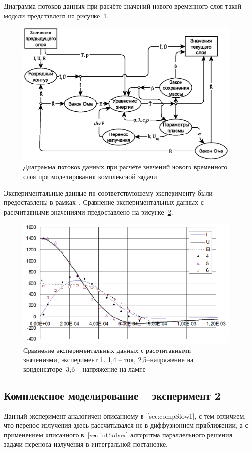 Диаграмма потоков данных при расчёте значений нового временного слоя такой 
модели представлена на рисунке~\ref{fig:dfdComplex}.

\begin{figure}
    \centering
    \includegraphics[width=.8\linewidth]{img/experiments/complexDiff/dfd}
    \caption{Диаграмма потоков данных при расчёте значений нового временного 
    слоя при моделировании комплексной задачи}
    \label{fig:dfdComplex}
\end{figure}

Экспериментальные данные по соответствующему эксперименту были предоставлены в 
рамках~\cite{alushtaConf}. Сравнение экспериментальных данных с рассчитанными 
значениями предоставлено на рисунке~\ref{fig:IUEComplexVsPE}.

\begin{figure}
    \centering
    \includegraphics[width=.8\linewidth]{img/experiments/complexDiff/IUELvsPE}
    \caption{Сравнение экспериментальных данных с рассчитанными значениями, 
    эксперимент 1. 1,4 -- ток, 2,5--напряжение на конденсаторе, 3,6 -- 
    напряжение на лампе}
    \label{fig:IUEComplexVsPE}
\end{figure}

\subsection{Комплексное моделирование -- эксперимент 2}
Данный эксперимент аналогичен описанному в~\ref{sec:compSlow1}, с тем отличием, 
что перенос излучения здесь рассчитывался не в диффузионном приближении, а с 
применением описанного в~\ref{sec:intSolver} алгоритма параллельного решения 
задачи переноса излучения в интегральной постановке.


